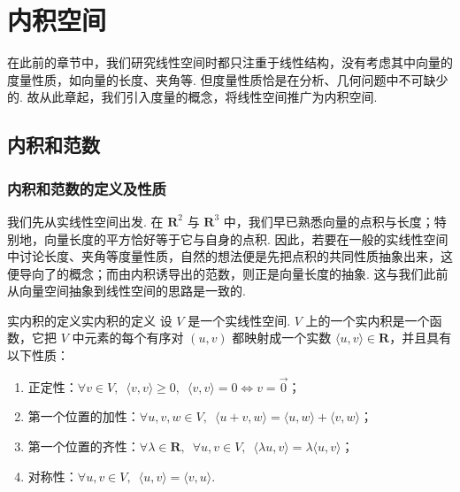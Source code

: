 \chapter{内积空间}

在此前的章节中，我们研究线性空间时都只注重于线性结构，没有考虑其中向量的度量性质，如向量的长度、夹角等. 但度量性质恰是在分析、几何问题中不可缺少的. 故从此章起，我们引入度量的概念，将线性空间推广为内积空间.

\section{内积和范数}

\subsection{内积和范数的定义及性质}

我们先从实线性空间出发. 在 $\mathbf{R}^{2}$ 与 $\mathbf{R}^{3}$ 中，我们早已熟悉向量的点积与长度；特别地，向量长度的平方恰好等于它与自身的点积. 因此，若要在一般的实线性空间中讨论长度、夹角等度量性质，自然的想法便是先把点积的共同性质抽象出来，这便导向了的概念；而由内积诱导出的范数，则正是向量长度的抽象. 这与我们此前从向量空间抽象到线性空间的思路是一致的.

\begin{definition}{实内积的定义}{实内积的定义}
设 $V$ 是一个实线性空间. $V$ 上的一个实内积是一个函数，它把 $V$ 中元素的每个有序对 $(u, v)$ 都映射成一个实数 $\langle u, v \rangle \in \mathbf{R}$，并且具有以下性质：
\begin{enumerate}
    \item 正定性：$\forall v \in V, \enspace \langle v, v \rangle \geqslant 0, \enspace \langle v, v \rangle = 0 \iff v = \vec{0}$；

    \item 第一个位置的加性：$\forall u, v, w \in V, \enspace \langle u + v, w \rangle = \langle u, w \rangle + \langle v, w \rangle$；

    \item 第一个位置的齐性：$\forall \lambda \in \mathbf{R}, \enspace \forall u, v \in V, \enspace \langle \lambda u, v \rangle = \lambda \langle u, v \rangle$；

    \item 对称性：$\forall u, v \in V, \enspace \langle u, v \rangle = \langle v, u \rangle$.
\end{enumerate}
\end{definition}


